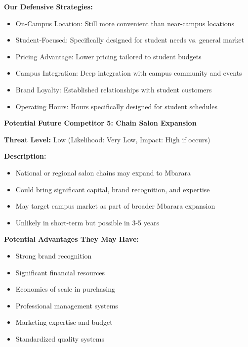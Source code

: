 \documentclass[a4paper,12pt]{article}
\begin{document}
\textbf{Our Defensive Strategies:}
\begin{itemize}[leftmargin=2em]
    \item On-Campus Location: Still more convenient than near-campus locations
    \item Student-Focused: Specifically designed for student needs vs. general market
    \item Pricing Advantage: Lower pricing tailored to student budgets
    \item Campus Integration: Deep integration with campus community and events
    \item Brand Loyalty: Established relationships with student customers
    \item Operating Hours: Hours specifically designed for student schedules
\end{itemize}

\vspace{1em}

\textbf{Potential Future Competitor 5: Chain Salon Expansion}

\textbf{Threat Level:} Low (Likelihood: Very Low, Impact: High if occurs)

\textbf{Description:}
\begin{itemize}[leftmargin=2em]
    \item National or regional salon chains may expand to Mbarara
    \item Could bring significant capital, brand recognition, and expertise
    \item May target campus market as part of broader Mbarara expansion
    \item Unlikely in short-term but possible in 3-5 years
\end{itemize}

\textbf{Potential Advantages They May Have:}
\begin{itemize}[leftmargin=2em]
    \item Strong brand recognition
    \item Significant financial resources
    \item Economies of scale in purchasing
    \item Professional management systems
    \item Marketing expertise and budget
    \item Standardized quality systems
\end{itemize}
\end{document}

